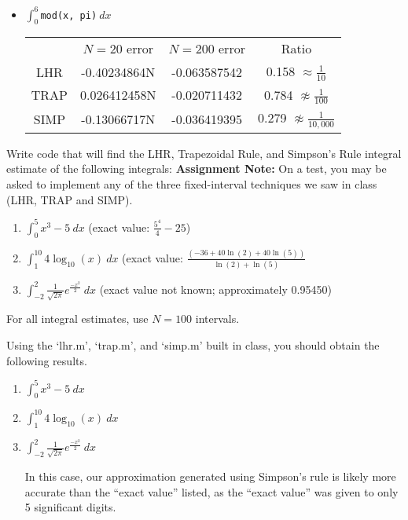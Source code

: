 \begin{enumerate}
\begin{Solution}
\begin{enumerate}
\begin{itemize}
  \item $\displaystyle \int_0^6 $\verb#mod(x, pi)#$~dx$ 
\begin{tabular}{ cccc }
& $N=20$ error & $N=200$ error & Ratio \\
LHR & -0.40234864N & -0.063587542& 0.158 $\approx \frac{1}{10}$\\
TRAP &  0.026412458N & -0.020711432& 0.784 $\not\approx \frac{1}{100}$\\
SIMP & -0.13066717N & -0.036419395& 0.279 $\not\approx \frac{1}{10,000}$\\
\end{tabular}
\end{itemize} 
\end{enumerate}
\end{Solution}
\end{enumerate}



\item Write code that will find the LHR, Trapezoidal Rule, and
  Simpson's Rule integral estimate of the following integrals: {\bf
    Assignment Note: } On a test, you may be asked to implement any of
  the three fixed-interval techniques we saw in class (LHR, TRAP and
  SIMP).
\begin{enumerate} 
\item $\displaystyle \int_0^5 x^3 - 5~dx$  (exact value: $\displaystyle \frac{5^4}{4} - 25$)
\item $\displaystyle \int_1^{10} 4 \log_{10}(x)~dx$ (exact value: 
$\displaystyle \frac{(-36+40 \ln(2)+40 \ln(5))}{\ln(2)+\ln(5)}$
\item $\displaystyle \int_{-2}^2 \frac{1}{\sqrt{2 \pi}} e^{\frac{-x^2}{2}}~dx$ (exact value not known; approximately  0.95450)
\end{enumerate} 

For all integral estimates, use $N = 100$ intervals.

\begin{Solution}
Using the `lhr.m', `trap.m', and `simp.m' built in class, you should 
obtain the following results.
\begin{enumerate} 
\item $\displaystyle \int_0^5 x^3 - 5~dx$



\item $\displaystyle \int_1^{10} 4 \log_{10}(x)~dx$ 



\item $\displaystyle \int_{-2}^2 \frac{1}{\sqrt{2 \pi}} e^{\frac{-x^2}{ 2}}~dx$


In this case, our approximation generated using Simpson's rule is
likely more accurate than the ``exact value'' listed, as the ``exact
value'' was given to only 5 significant digits.

\end{enumerate} 
\end{Solution}


